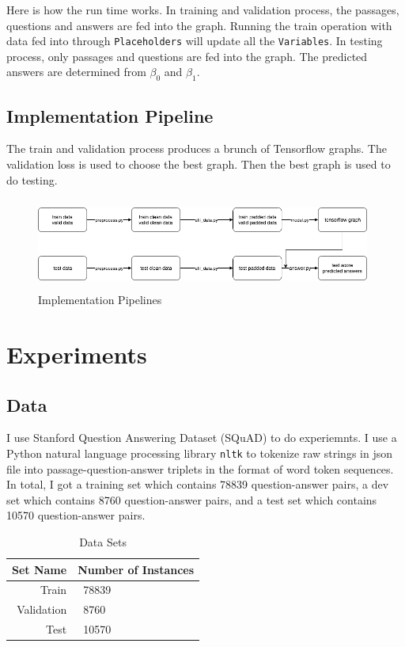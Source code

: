 \documentclass[modernstyle,12pt]{sjsuthesis}
\theoremstyle{definition}
\begin{document}
Here is how the run time works. In training and validation process, the passages, questions and answers are fed into the graph. Running the train operation with data fed into through {\tt Placeholders} will update all the {\tt Variables}. In testing process, only passages and questions are fed into the graph. The predicted answers are determined from $\beta _0$ and $\beta _1$.






\section{Implementation Pipeline}

The train and validation process produces a brunch of Tensorflow graphs. The validation loss is used to choose the best graph. Then the best graph is used to do testing.

\begin{figure}[htbp]\centering
  \includegraphics[width=11cm, height=3cm]{figures/pipeline.png}
  \caption{Implementation Pipelines}
  \label{f:pipeline}
\end{figure}


\chapter{Experiments}
\section{Data}
I use Stanford Question Answering Dataset (SQuAD) to do experiemnts. I use a Python natural language processing library {\tt nltk} to tokenize raw strings in json file into passage-question-answer triplets in the format of word token sequences. In total, I got a training set which contains 78839 question-answer pairs, a dev set which contains 8760 question-answer pairs, and a test set which contains 10570 question-answer pairs.

\begin{table}[htbp]\centering
  \caption{Data Sets}
  \label{tab:dataset}
  \begin{tabular}{|r|l|} \hline
    Set Name & Number of Instances \\ \hline\hline
    Train & \ 78839 \\
    Validation & \ 8760 \\
    Test & \ 10570 \\ \hline
  \end{tabular}
\end{table}
\end{document}
